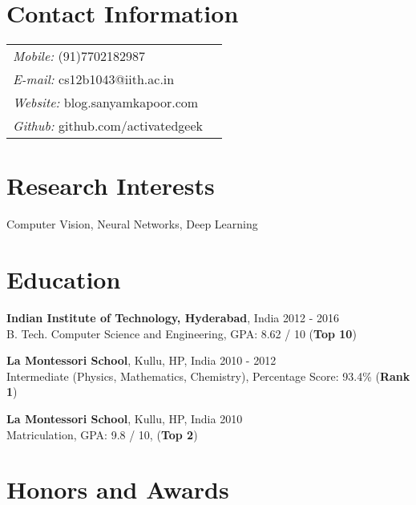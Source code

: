 \documentclass[margin,line]{res}
\begin{document}

\begin{resume}

\section{\sc Contact Information}

  \vspace{.05in}
  \begin{tabular}{@{}p{2.9in}p{4in}}

	{\it Mobile:}  (91)7702182987 \\
	{\it E-mail:}  cs12b1043@iith.ac.in\\
	{\it Website:} blog.sanyamkapoor.com \\
	{\it Github:} github.com/activatedgeek \\

  \end{tabular}

\section{\sc Research Interests}
  Computer Vision, Neural Networks, Deep Learning

\section{\sc Education}

  {\bf Indian Institute of Technology, Hyderabad}, India \hfill 2012 - 2016 \\
  	B. Tech. Computer Science and Engineering,
	GPA: 8.62 / 10 ({\bf Top 10})

  \vspace*{-2.5mm}

  {\bf La Montessori School}, Kullu, HP, India \hfill 2010 - 2012 \\
	Intermediate (Physics, Mathematics, Chemistry),
    Percentage Score: 93.4\% ({\bf Rank 1})

  \vspace*{-2.5mm}

  {\bf La Montessori School}, Kullu, HP, India \hfill 2010 \\
	Matriculation,
    GPA: 9.8 / 10, ({\bf Top 2})

\section{\sc Honors and Awards}


\end{resume}
\end{document}
